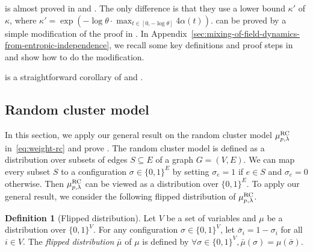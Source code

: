 \documentclass[11pt,a4paper]{article}
\theoremstyle{definition}
\newtheorem{definition}[theorem]{Definition}
\begin{document}
     is almost proved in \cite{ChenE22} and \cite{Chen0Y23}. The only difference is that they use a lower bound $\kappa'$ of $\kappa$, where $\kappa' = \exp(- \log \theta \cdot \max_{t \in [0,-\log \theta]} 4\alpha(t))$.  can be proved by a simple modification of the proof in \cite{Chen0Y23}. In Appendix~\ref{sec:mixing-of-field-dynamics-from-entropic-independence}, we recall some key definitions and proof steps in \cite{Chen0Y23} and show how to do the modification.

     is a straightforward corollary of  and .





\subsection{Random cluster model}
In this section, we apply our general result on the random cluster model $\mu_{p,\lambda}^{\textnormal{RC}}$ in~\eqref{eq:weight-rc} and prove . The random cluster model is defined as a distribution over subsets of edges $S \subseteq E$ of a graph $G=(V,E)$. We can map every subset $S$ to a configuration $\sigma \in \{0,1\}^E$ by setting $\sigma_e = 1$ if $e \in S$ and $\sigma_e = 0$ otherwise. Then $\mu_{p,\lambda}^{\textnormal{RC}}$ can be viewed as a distribution over $\{0,1\}^E$. To apply our general result, we consider the following flipped distribution of $\mu_{p,\lambda}^{\textnormal{RC}}$.

\begin{definition}[Flipped distribution]\label{def:flipped-distribution}
    Let $V$ be a set of variables and $\mu$ be a distribution over $\{0,1\}^V$.
    For any configuration $\sigma\in \{0,1\}^V$, let $\bar{\sigma}_i=1-\sigma_i$ for all $i\in V$. The \emph{flipped distribution} $\bar{\mu}$ of $\mu$ is defined by $\forall \sigma\in \{0,1\}^V, \bar{\mu}(\sigma) = \mu(\bar{\sigma})$.
\end{definition}
\end{document}

